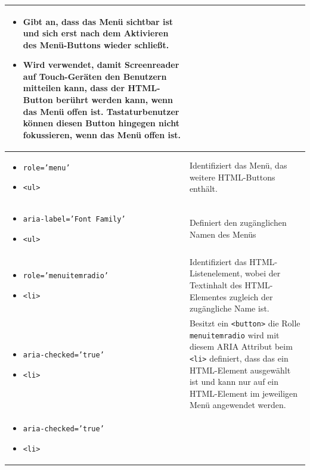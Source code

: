 \begin{longtable}{| p{} | p{} |}
\begin{itemize}[label={}, leftmargin=*]
			das Menü wieder schließt.
		\item Gibt an, dass das Menü sichtbar ist und sich erst nach dem Aktivieren des Menü-Buttons wieder 
			schließt.
		\item Wird verwendet, damit Screenreader auf Touch-Geräten den Benutzern mitteilen kann, dass der
			HTML-Button berührt werden kann, wenn das Menü offen ist. Tastaturbenutzer können diesen
			Button hingegen nicht fokussieren, wenn das Menü offen ist.
	\end{itemize} \\
	\hline
	\begin{itemize}[label={}, leftmargin=*]
		\item \texttt{role='menu'} 
		\item \texttt{<ul>}
	\end{itemize}
	& Identifiziert das Menü, das weitere HTML-Buttons enthält.\\
	\hline
	\begin{itemize}[label={}, leftmargin=*]
		\item \texttt{aria-label='Font Family'} 
		\item \texttt{<ul>}
	\end{itemize}
	& Definiert den zugänglichen Namen des Menüs\\
	\hline
	\begin{itemize}[label={}, leftmargin=*]
		\item \texttt{role='menuitemradio'} 
		\item \texttt{<li>}
	\end{itemize}
	& Identifiziert das HTML-Listenelement, wobei der Textinhalt des HTML-Elementes zugleich der zugängliche
		Name ist.\\
	\hline
	\begin{itemize}[label={}, leftmargin=*]
		\item \texttt{aria-checked='true'} 
		\item \texttt{<li>}
	\end{itemize}
	& Besitzt ein \texttt{<button>} die Rolle \texttt{menuitemradio} wird mit diesem ARIA Attribut beim \texttt{<li>} 
		definiert, dass das ein HTML-Element ausgewählt ist und kann nur auf ein HTML-Element im jeweiligen 
		Menü angewendet werden.\\
	\hline
	\begin{itemize}[label={}, leftmargin=*]
		\item \texttt{aria-checked='true'} 
		\item \texttt{<li>}
	\end{itemize}

\end{longtable}
